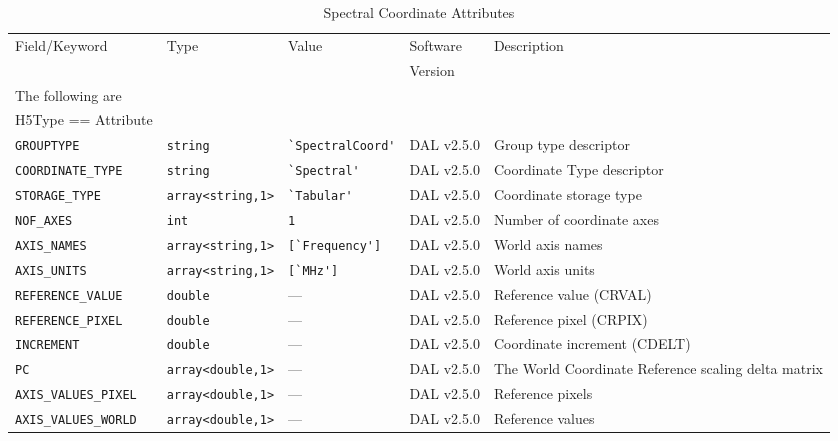\documentclass[a4paper,10pt,bibtotoc]{scrartcl}
\begin{document}
\begin{table}[p]
\begin{small}
\begin{center}
  \begin{tabular}{|llllp{4.5cm}|}
    \hline
    \sc Field/Keyword  & \sc Type & \sc Value & \sc Software  & Description \\
    \sc   & \sc & \sc & \sc Version  & \\
    \hline \hline
    \sc The following are & \sc & \sc & \sc   &\\
    \sc H5Type == Attribute & \sc & \sc & \sc   &\\
    \hline 
    \verb|GROUPTYPE|   & \verb|string| & \verb|`SpectralCoord'| & DAL v2.5.0 & Group type descriptor\\
    \verb|COORDINATE_TYPE| & \verb|string| & \verb|`Spectral'| & DAL v2.5.0 & Coordinate Type  descriptor \\
    \verb|STORAGE_TYPE| & \verb|array<string,1>| & \verb|`Tabular'| & DAL v2.5.0 & Coordinate storage type \\    
    \verb|NOF_AXES|    & \verb|int| & \verb|1| & DAL v2.5.0 & Number of coordinate axes \\
    \verb|AXIS_NAMES|  & \verb|array<string,1>| & \verb|[`Frequency']| & DAL v2.5.0 & World axis names \\
    \verb|AXIS_UNITS|  & \verb|array<string,1>| & \verb|[`MHz']| & DAL v2.5.0 & World axis units \\
    \verb|REFERENCE_VALUE|  & \verb|double| & --- & DAL v2.5.0 & Reference value (CRVAL) \\
    \verb|REFERENCE_PIXEL|  & \verb|double| & --- & DAL v2.5.0 & Reference pixel (CRPIX) \\
    \verb|INCREMENT|  & \verb|double| & --- & DAL v2.5.0 & Coordinate increment (CDELT) \\
    \verb|PC|     & \verb|array<double,1>| & --- & DAL v2.5.0 & The World Coordinate Reference scaling delta matrix \\
    \verb|AXIS_VALUES_PIXEL|  & \verb|array<double,1>| & --- & DAL v2.5.0 & Reference pixels \\
    \verb|AXIS_VALUES_WORLD|  & \verb|array<double,1>| & --- & DAL v2.5.0 & Reference values \\
 \hline
\end{tabular}
\end{center}
\end{small}
\caption{Spectral Coordinate Attributes}
\label{tab:spectral coordinate}
\end{table}
\end{document}
